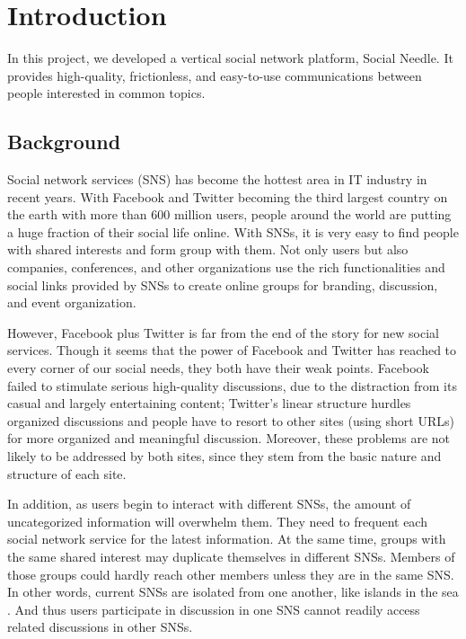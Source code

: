 
%
%

\chapter{Introduction}
In this project, we developed a vertical social network platform, Social Needle. It provides high-quality, frictionless, and easy-to-use communications between people interested in common topics. 

\section{Background}
Social network services (SNS) has become the hottest area in IT industry in recent years. With Facebook and Twitter becoming the third largest country on the earth with more than 600 million users, people around the world are putting a huge fraction of their social life online. With SNSs, it is very easy to find people with shared interests and form group with them. Not only users but also companies, conferences, and other organizations use the rich functionalities and social links provided by SNSs to create online groups for branding, discussion, and event organization.

However, Facebook plus Twitter is far from the end of the story for new social services. Though it seems that the power of Facebook and Twitter has reached to every corner of our social needs, they both have their weak points. Facebook failed to stimulate serious high-quality discussions, due to the distraction from its casual and largely entertaining content; Twitter's linear structure hurdles organized discussions and people have to resort to other sites (using short URLs) for more organized and meaningful discussion. Moreover, these problems are not likely to be addressed by both sites, since they stem from the basic nature and structure of each site.

In addition, as users begin to interact with different SNSs, the amount of uncategorized information will overwhelm them. They need to frequent each social network service for the latest information. At the same time, groups with the same shared interest may duplicate themselves in different SNSs. Members of those groups could hardly reach other members unless they are in the same SNS. In other words, current SNSs are isolated from one another, like islands in the sea \cite{10.1109/MIS.2008.50}. And thus users participate in discussion in one SNS cannot readily
access related discussions in other SNSs.

